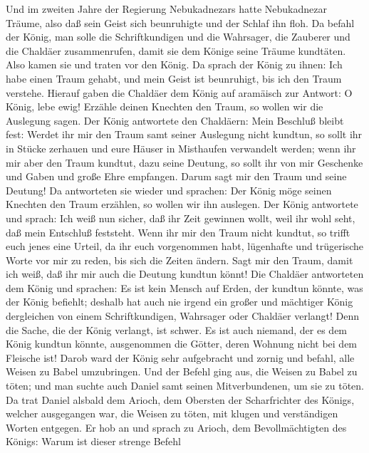 Und im zweiten Jahre der Regierung Nebukadnezars hatte
Nebukadnezar Träume, also daß sein Geist sich beunruhigte und der Schlaf
ihn floh.  Da befahl der König, man solle die
Schriftkundigen und die Wahrsager, die Zauberer und die Chaldäer
zusammenrufen, damit sie dem Könige seine Träume kundtäten. Also kamen
sie und traten vor den König.  Da sprach der König zu
ihnen: Ich habe einen Traum gehabt, und mein Geist ist beunruhigt, bis
ich den Traum verstehe.  Hierauf gaben die Chaldäer dem
König auf aramäisch zur Antwort: O König, lebe ewig! Erzähle deinen
Knechten den Traum, so wollen wir die Auslegung sagen. 
Der König antwortete den Chaldäern: Mein Beschluß bleibt fest: Werdet
ihr mir den Traum samt seiner Auslegung nicht kundtun, so sollt ihr in
Stücke zerhauen und eure Häuser in Misthaufen verwandelt werden;
 wenn ihr mir aber den Traum kundtut, dazu seine Deutung,
so sollt ihr von mir Geschenke und Gaben und große Ehre empfangen. Darum
sagt mir den Traum und seine Deutung!  Da antworteten sie
wieder und sprachen: Der König möge seinen Knechten den Traum erzählen,
so wollen wir ihn auslegen.  Der König antwortete und
sprach: Ich weiß nun sicher, daß ihr Zeit gewinnen wollt, weil ihr wohl
seht, daß mein Entschluß feststeht.  Wenn ihr mir den
Traum nicht kundtut, so trifft euch jenes eine Urteil, da ihr euch
vorgenommen habt, lügenhafte und trügerische Worte vor mir zu reden, bis
sich die Zeiten ändern. Sagt mir den Traum, damit ich weiß, daß ihr mir
auch die Deutung kundtun könnt!  Die Chaldäer antworteten
dem König und sprachen: Es ist kein Mensch auf Erden, der kundtun
könnte, was der König befiehlt; deshalb hat auch nie irgend ein großer
und mächtiger König dergleichen von einem Schriftkundigen, Wahrsager
oder Chaldäer verlangt!  Denn die Sache, die der König
verlangt, ist schwer. Es ist auch niemand, der es dem König kundtun
könnte, ausgenommen die Götter, deren Wohnung nicht bei dem Fleische
ist!  Darob ward der König sehr aufgebracht und zornig
und befahl, alle Weisen zu Babel umzubringen.  Und der
Befehl ging aus, die Weisen zu Babel zu töten; und man suchte auch
Daniel samt seinen Mitverbundenen, um sie zu töten.  Da
trat Daniel alsbald dem Arioch, dem Obersten der Scharfrichter des
Königs, welcher ausgegangen war, die Weisen zu töten, mit klugen und
verständigen Worten entgegen.  Er hob an und sprach zu
Arioch, dem Bevollmächtigten des Königs: Warum ist dieser strenge Befehl
